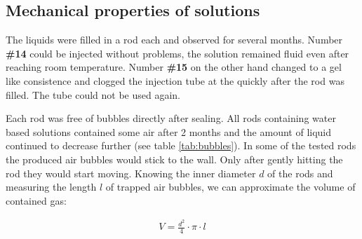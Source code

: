 \clearpage

\subsection{Mechanical properties of solutions}
\label{sec:sol-mech}

The liquids were filled in a rod each and observed for several months.
Number \textbf{\#14} could be injected without problems, the solution remained fluid even after reaching room temperature.
Number \textbf{\#15} on the other hand changed to a gel like consistence and clogged the injection tube at the quickly after the rod was filled.
The tube could not be used again.

Each rod was free of bubbles directly after sealing.
All rods containing water based solutions contained some air after 2 months and the amount of liquid continued to decrease further (see table \ref{tab:bubbles}).
In some of the tested rods the produced air bubbles would stick to the wall. Only after gently hitting the rod they would start moving.
Knowing the inner diameter $d$ of the rods and measuring the length $l$ of trapped air bubbles, we can approximate the volume of contained gas:

\begin{align}
 V = \frac{d^2}{4}\cdot \pi \cdot l
\end{align}

